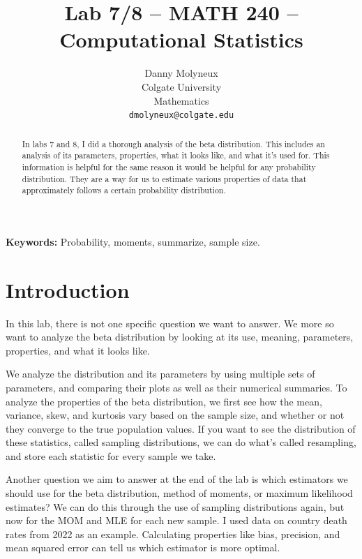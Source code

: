 \documentclass{article}\usepackage[]{graphicx}\usepackage[]{xcolor}
\begin{document}
\vspace{-1in}
\title{Lab 7/8 -- MATH 240 -- Computational Statistics}

\author{
  Danny Molyneux \\
  Colgate University  \\
  Mathematics  \\
  {\tt dmolyneux@colgate.edu}
}


\maketitle

\begin{multicols}{2} \raggedcolumns
\begin{abstract}
In labs 7 and 8, I did a thorough analysis of the beta distribution. This includes an analysis of its parameters, properties, what it looks like, and what it's used for. This information is helpful for the same reason it would be helpful for any probability distribution. They are a way for us to estimate various properties of data that approximately follows a certain probability distribution.
\end{abstract}

\noindent \textbf{Keywords:} Probability, moments, summarize, sample size.

\section{Introduction}
In this lab, there is not one specific question we want to answer. We more so want to analyze the beta distribution by looking at its use, meaning, parameters, properties, and what it looks like.

We analyze the distribution and its parameters by using multiple sets of parameters, and comparing their plots as well as their numerical summaries. To analyze the properties of the beta distribution, we first see how the mean, variance, skew, and kurtosis vary based on the sample size, and whether or not they converge to the true population values. If you want to see the distribution of these statistics, called sampling distributions, we can do what's called resampling, and store each statistic for every sample we take. 

Another question we aim to answer at the end of the lab is which estimators we should use for the beta distribution, method of moments, or maximum likelihood estimates? We can do this through the use of sampling distributions again, but now for the MOM and MLE for each new sample. I used data on country death rates from 2022 as an example. Calculating properties like bias, precision, and mean squared error can tell us which estimator is more optimal. 


\end{multicols}
\end{document}
